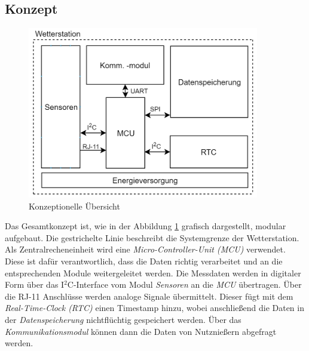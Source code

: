 \subsection{Konzept}
\label{subsec:Konzept}
\begin{figure}[h]
	\centering
	\includegraphics[width=0.9\textwidth]{graphics/Konzeptdiagramme/Grundkonzept.PNG}	
	\caption{Konzeptionelle Übersicht}
	\label{fig:grundkonzept}
\end{figure}

Das Gesamtkonzept ist, wie in der Abbildung \ref{fig:grundkonzept} grafisch dargestellt, modular aufgebaut. Die gestrichelte Linie beschreibt die Systemgrenze der Wetterstation. Als Zentralrecheneinheit wird eine \textit{Micro-Controller-Unit (MCU)} verwendet. Diese ist dafür verantwortlich, dass die Daten richtig verarbeitet und an die entsprechenden Module weitergeleitet werden. Die Messdaten werden in digitaler Form über das I$^{2}$C-Interface vom Modul \textit{Sensoren} an die \textit{MCU} übertragen. Über die RJ-11 Anschlüsse werden analoge Signale übermittelt. Dieser fügt mit dem \textit{Real-Time-Clock (RTC)} einen Timestamp hinzu, wobei anschließend die Daten in der \textit{Datenspeicherung} nichtflüchtig gespeichert werden. Über das \textit{Kommunikationsmodul} können dann die Daten von Nutznießern abgefragt werden.\\

\newpage





\newpage

